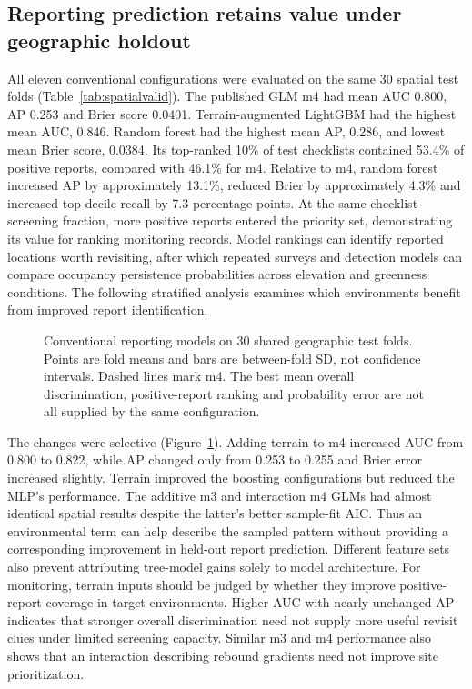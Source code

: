 \subsection{Reporting prediction retains value under geographic holdout}
All eleven conventional configurations were evaluated on the same 30 spatial test folds (Table~\ref{tab:spatialvalid}). The published GLM m4 had mean AUC 0.800, AP 0.253 and Brier score 0.0401. Terrain-augmented LightGBM had the highest mean AUC, 0.846. Random forest had the highest mean AP, 0.286, and lowest mean Brier score, 0.0384. Its top-ranked 10\% of test checklists contained 53.4\% of positive reports, compared with 46.1\% for m4. Relative to m4, random forest increased AP by approximately 13.1\%, reduced Brier by approximately 4.3\% and increased top-decile recall by 7.3 percentage points. At the same checklist-screening fraction, more positive reports entered the priority set, demonstrating its value for ranking monitoring records. Model rankings can identify reported locations worth revisiting, after which repeated surveys and detection models can compare occupancy persistence probabilities across elevation and greenness conditions. The following stratified analysis examines which environments benefit from improved report identification.
\begin{figure}[htbp]\centering
{}
\caption{Conventional reporting models on 30 shared geographic test folds. Points are fold means and bars are between-fold SD, not confidence intervals. Dashed lines mark m4. The best mean overall discrimination, positive-report ranking and probability error are not all supplied by the same configuration.}\label{fig:validbench}
\end{figure}

The changes were selective (Figure~\ref{fig:validbench}). Adding terrain to m4 increased AUC from 0.800 to 0.822, while AP changed only from 0.253 to 0.255 and Brier error increased slightly. Terrain improved the boosting configurations but reduced the MLP's performance. The additive m3 and interaction m4 GLMs had almost identical spatial results despite the latter's better sample-fit AIC. Thus an environmental term can help describe the sampled pattern without providing a corresponding improvement in held-out report prediction. Different feature sets also prevent attributing tree-model gains solely to model architecture. For monitoring, terrain inputs should be judged by whether they improve positive-report coverage in target environments. Higher AUC with nearly unchanged AP indicates that stronger overall discrimination need not supply more useful revisit clues under limited screening capacity. Similar m3 and m4 performance also shows that an interaction describing rebound gradients need not improve site prioritization.

